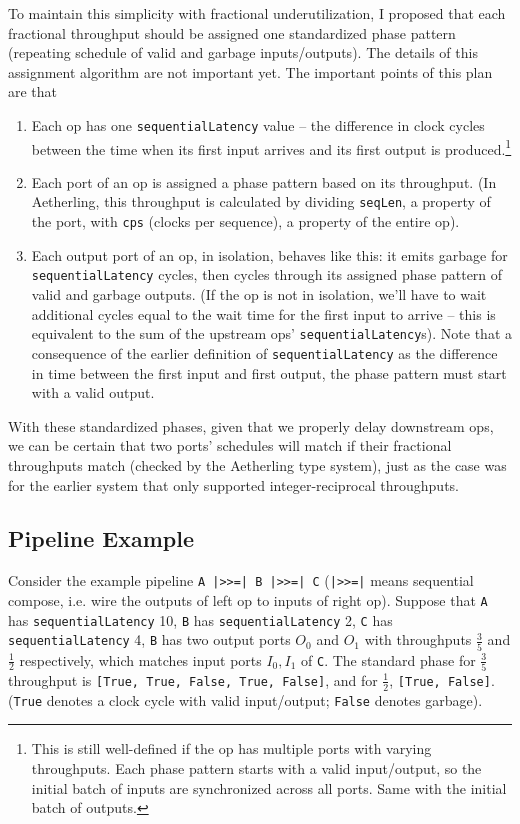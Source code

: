 \documentclass[12pt]{article}
\begin{document}
To maintain this simplicity with fractional underutilization, I
proposed that each fractional throughput should be assigned one
standardized phase pattern (repeating schedule of valid and garbage
inputs/outputs). The details of this assignment algorithm are not
important yet. The important points of this plan are that
\begin{enumerate}
\item Each op has one \texttt{sequentialLatency} value -- the
  difference in clock cycles between the time when its first input
  arrives and its first output is produced.\footnote{This is still
    well-defined if the op has multiple ports with varying
    throughputs. Each phase pattern starts with a valid input/output,
    so the initial batch of inputs are synchronized across all
    ports. Same with the initial batch of outputs. }
\item Each port of an op is assigned a phase pattern based on its
  throughput. (In Aetherling, this throughput is calculated by
  dividing \texttt{seqLen}, a property of the port, with \texttt{cps}
  (clocks per sequence), a property of the entire op).
\item Each output port of an op, in isolation, behaves like this: it
  emits garbage for \texttt{sequentialLatency} cycles, then cycles
  through its assigned phase pattern of valid and garbage outputs. (If
  the op is not in isolation, we'll have to wait additional cycles
  equal to the wait time for the first input to arrive -- this is
  equivalent to the sum of the upstream ops'
  \texttt{sequentialLatency}s). Note that a consequence of the earlier
  definition of \texttt{sequentialLatency} as the difference in time
  between the first input and first output, the phase pattern must
  start with a valid output.
\end{enumerate}

With these standardized phases, given that we properly delay
downstream ops, we can be certain that two ports' schedules will match
if their fractional throughputs match (checked by the Aetherling type
system), just as the case was for the earlier system that only
supported integer-reciprocal throughputs.

\subsection{Pipeline Example}

Consider the example pipeline \texttt{A |>>=| B |>>=| C}
(\texttt{|>>=|} means sequential compose, i.e. wire the outputs of
left op to inputs of right op). Suppose that \texttt{A} has
\texttt{sequentialLatency} 10, \texttt{B} has \texttt{sequentialLatency}
2, \texttt{C} has \texttt{sequentialLatency} 4, \texttt{B} has two output
ports $O_0$ and $O_1$ with throughputs $\frac{3}{5}$ and $\frac{1}{2}$
respectively, which matches input ports $I_0, I_1$ of \texttt{C}.
The standard phase for $\frac{3}{5}$ throughput is
\texttt{[True, True, False, True, False]},
and for $\frac{1}{2}$, \texttt{[True, False]}. (\texttt{True} denotes
a clock cycle with valid input/output; \texttt{False} denotes garbage).
\end{document}
